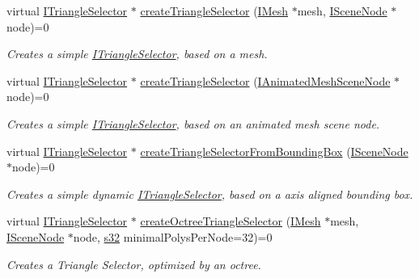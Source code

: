 \begin{DoxyCompactItemize}
virtual \hyperlink{classirr_1_1scene_1_1ITriangleSelector}{I\+Triangle\+Selector} $\ast$ \hyperlink{classirr_1_1scene_1_1ISceneManager_a266625379b1558e9be1dc062ea4e71f7}{create\+Triangle\+Selector} (\hyperlink{classirr_1_1scene_1_1IMesh}{I\+Mesh} $\ast$mesh, \hyperlink{classirr_1_1scene_1_1ISceneNode}{I\+Scene\+Node} $\ast$node)=0
\begin{DoxyCompactList}\small\item\em Creates a simple \hyperlink{classirr_1_1scene_1_1ITriangleSelector}{I\+Triangle\+Selector}, based on a mesh. \end{DoxyCompactList}\item 
virtual \hyperlink{classirr_1_1scene_1_1ITriangleSelector}{I\+Triangle\+Selector} $\ast$ \hyperlink{classirr_1_1scene_1_1ISceneManager_abc1ecc9a60abb40e7ffddbd72c077231}{create\+Triangle\+Selector} (\hyperlink{classirr_1_1scene_1_1IAnimatedMeshSceneNode}{I\+Animated\+Mesh\+Scene\+Node} $\ast$node)=0
\begin{DoxyCompactList}\small\item\em Creates a simple \hyperlink{classirr_1_1scene_1_1ITriangleSelector}{I\+Triangle\+Selector}, based on an animated mesh scene node. \end{DoxyCompactList}\item 
virtual \hyperlink{classirr_1_1scene_1_1ITriangleSelector}{I\+Triangle\+Selector} $\ast$ \hyperlink{classirr_1_1scene_1_1ISceneManager_adb717113b4203e92f2bd95c84488059c}{create\+Triangle\+Selector\+From\+Bounding\+Box} (\hyperlink{classirr_1_1scene_1_1ISceneNode}{I\+Scene\+Node} $\ast$node)=0
\begin{DoxyCompactList}\small\item\em Creates a simple dynamic \hyperlink{classirr_1_1scene_1_1ITriangleSelector}{I\+Triangle\+Selector}, based on a axis aligned bounding box. \end{DoxyCompactList}\item 
virtual \hyperlink{classirr_1_1scene_1_1ITriangleSelector}{I\+Triangle\+Selector} $\ast$ \hyperlink{classirr_1_1scene_1_1ISceneManager_a4ed7d3b34f4d0c70395b6d464fe32b96}{create\+Octree\+Triangle\+Selector} (\hyperlink{classirr_1_1scene_1_1IMesh}{I\+Mesh} $\ast$mesh, \hyperlink{classirr_1_1scene_1_1ISceneNode}{I\+Scene\+Node} $\ast$node, \hyperlink{namespaceirr_ac66849b7a6ed16e30ebede579f9b47c6}{s32} minimal\+Polys\+Per\+Node=32)=0
\begin{DoxyCompactList}\small\item\em Creates a Triangle Selector, optimized by an octree. \end{DoxyCompactList}\item 

\end{DoxyCompactItemize}
